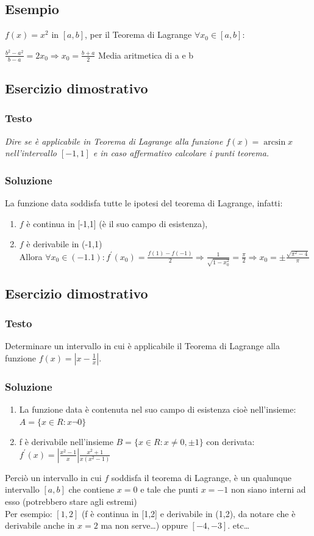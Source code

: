 \subsection{Esempio}
$f(x)=x^2 \text{ in } [a,b]$, per il Teorema di Lagrange $\forall x_0 \in
[a,b]$:
\begin{center}
	$\frac{b^2-a^2}{b-a}=2x_0\Rightarrow x_0=\frac{b+a}{2}$ Media aritmetica di
	a e b
\end{center}
\subsection{Esercizio dimostrativo}
\subsubsection{Testo}
\textit{Dire se è applicabile in Teorema di Lagrange alla funzione
$f(x)=\arcsin x$ nell'intervallo $[-1,1]$ e in caso affermativo calcolare i
punti teorema.}
\subsubsection{Soluzione}
La funzione data soddisfa tutte le ipotesi del teorema di Lagrange, infatti:
\begin{enumerate}
	\item $f$ è continua in [-1,1] (è il suo campo di esistenza),
	\item $f$ è derivabile in (-1,1)\\
		Allora $\forall x_0\in (-1.1):f^\prime
		(x_0)=\frac{f(1)-f(-1)}{2}\Rightarrow
		\frac{1}{\sqrt{1-x^2_0}}=\frac{\pi}{2}\Rightarrow
		x_0=\pm\frac{\sqrt{\pi^2-4}}{\pi}$
\end{enumerate}
\subsection{Esercizio dimostrativo}
\subsubsection{Testo}
Determinare un intervallo in cui è applicabile il Teorema di Lagrange alla
funzione $f(x)=|x-\frac{1}{x}|$.
\subsubsection{Soluzione}
\begin{enumerate}
	\item La funzione data è contenuta nel suo campo di esistenza cioè
		nell'insieme: $A=\{x \in R: x\neg 0\}$
	\item f è derivabile nell'insieme $B=\{x\in R: x\neq 0,\pm 1\}$ con
		derivata: $f^\prime(x)=|\frac{x^2-1}{x}|\frac{x^2+1}{x(x^2-1)}$
\end{enumerate}
Perciò un intervallo in cui $f$ soddisfa il teorema di Lagrange, è un qualunque
intervallo $[a,b]$ che contiene $x=0$ e tale che punti $x=-1$ non siano interni
ad esso (potrebbero stare agli estremi)\\
Per esempio: $[1,2]$ (f è continua in [1,2] e derivabile in (1,2), da notare
che è derivabile anche in $x=2$ ma non serve\dots) oppure $[-4,-3]$. etc\dots

